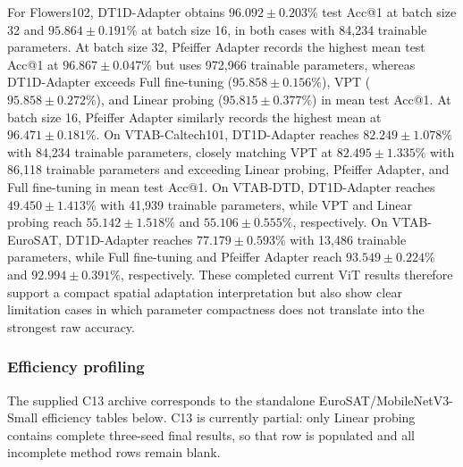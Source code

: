 \documentclass[pdflatex,sn-mathphys-num]{sn-jnl}
\theoremstyle{thmstyleone}
\theoremstyle{thmstyletwo}
\theoremstyle{thmstylethree}
\begin{document}
For Flowers102, DT1D-Adapter obtains $96.092\pm0.203\%$ test Acc@1 at batch size 32 and $95.864\pm0.191\%$ at batch size 16, in both cases with 84,234 trainable parameters. At batch size 32, Pfeiffer Adapter records the highest mean test Acc@1 at $96.867\pm0.047\%$ but uses 972,966 trainable parameters, whereas DT1D-Adapter exceeds Full fine-tuning ($95.858\pm0.156\%$), VPT ($95.858\pm0.272\%$), and Linear probing ($95.815\pm0.377\%$) in mean test Acc@1. At batch size 16, Pfeiffer Adapter similarly records the highest mean at $96.471\pm0.181\%$. On VTAB-Caltech101, DT1D-Adapter reaches $82.249\pm1.078\%$ with 84,234 trainable parameters, closely matching VPT at $82.495\pm1.335\%$ with 86,118 trainable parameters and exceeding Linear probing, Pfeiffer Adapter, and Full fine-tuning in mean test Acc@1. On VTAB-DTD, DT1D-Adapter reaches $49.450\pm1.413\%$ with 41,939 trainable parameters, while VPT and Linear probing reach $55.142\pm1.518\%$ and $55.106\pm0.555\%$, respectively. On VTAB-EuroSAT, DT1D-Adapter reaches $77.179\pm0.593\%$ with 13,486 trainable parameters, while Full fine-tuning and Pfeiffer Adapter reach $93.549\pm0.224\%$ and $92.994\pm0.391\%$, respectively. These completed current ViT results therefore support a compact spatial adaptation interpretation but also show clear limitation cases in which parameter compactness does not translate into the strongest raw accuracy.

\FloatBarrier
\subsubsection{Efficiency profiling}

The supplied C13 archive corresponds to the standalone EuroSAT/MobileNetV3-Small efficiency tables below. C13 is currently partial: only Linear probing contains complete three-seed final results, so that row is populated and all incomplete method rows remain blank.
\end{document}
